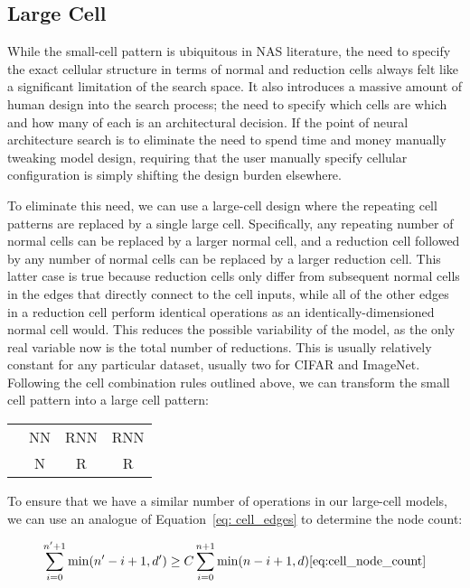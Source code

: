 \subsection{Large Cell}
While the small-cell pattern is ubiquitous in NAS literature, the need to specify the exact cellular structure in terms
of normal and reduction cells always felt like a significant limitation of the search space. It also introduces a massive
amount of human design into the search process; the need to specify which cells are which and how many of each is an
architectural decision. If the point of neural architecture search is to eliminate the need to spend time and money
manually tweaking model design, requiring that the user manually specify cellular configuration is simply shifting
the design burden elsewhere.

To eliminate this need, we can use a large-cell design where the repeating cell patterns are replaced by a single large
cell. Specifically,  any repeating number of normal cells can be replaced by a larger normal cell, and a reduction cell
followed by any number of normal cells can be replaced by a larger reduction cell. This latter case is true because
reduction cells only differ from subsequent normal cells in the edges that directly connect to the cell inputs, while all
of the other edges in a reduction cell perform identical operations as an identically-dimensioned normal cell would.
This reduces the possible variability of the model, as the only real variable now is the total number of reductions. This
is usually relatively constant for any particular dataset, usually two for CIFAR and ImageNet\cite{liu2018}\cite{xi2019}\cite{xu2020}\cite{pham2018}.
Following the cell combination rules outlined above, we can transform the small cell pattern into a large cell pattern:

\begin{center}
\begin{tabular}{rccc}
	\text{Small Cell:} & NN & RNN & RNN \\
	\text{Large Cell:} & N  & R   & R
\end{tabular}
\end{center}

To ensure that we have a similar number of operations in our large-cell models, we can use an analogue of Equation~\ref{eq: cell_edges}
to determine the node count:

\begin{align}
	\sum_{i=0}^{n'+1} \min(n'-i+1, d') \ge C \sum_{i=0}^{n+1} \min(n-i+1, d) \cite{eq:cell_node_count}
\end{align}

